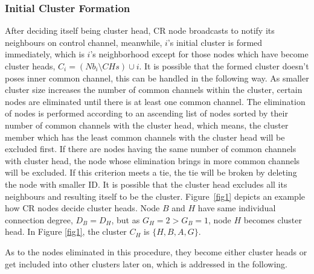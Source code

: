 \subsubsection*{Initial Cluster Formation}
After deciding itself being cluster head, CR node broadcasts to notify its neighbours on control channel, meanwhile, $i$'s initial cluster is formed immediately, which is $i$'s neighborhood except for those nodes which have become cluster heads, \ie $C_i=(Nb_i\setminus CHs)\cup i$.
It is possible that the formed cluster doesn't poses inner common channel, this can be handled in the following way. 
As smaller cluster size increases the number of common channels within the cluster, certain nodes are eliminated until there is at least one common channel.
The elimination of nodes is performed according to an ascending list of nodes sorted by their number of common channels with the cluster head, which means, the cluster member which has the least common channels with the cluster head will be excluded first.
If there are nodes having the same number of common channels with cluster head, the node whose elimination brings in more common channels will be excluded.
If this criterion meets a tie, the tie will be broken by deleting the node with smaller ID.
It is possible that the cluster head excludes all its neighbours and resulting itself to be the cluster.
Figure~\ref{fig1} depicts an example how CR nodes decide cluster heads. 
Node $B$ and $H$ have same individual connection degree, $D_B=D_H$, but as $G_H=2>G_B=1$, node $H$ becomes cluster head.
In Figure \ref{fig1}, the cluster $C_H$ is $\{H, B, A, G\}$.

As to the nodes eliminated in this procedure, they become either cluster heads or get included into other clusters later on, which is addressed in the following. 

